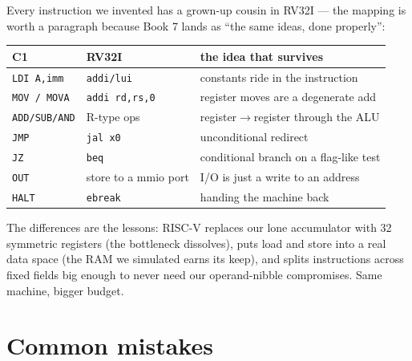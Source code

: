 Every instruction we invented has a grown-up cousin in RV32I --- the
mapping is worth a paragraph because Book 7 lands as ``the same
ideas, done properly'':

\begin{center}
\begin{tabular}{lll}
\toprule
C1 & RV32I & the idea that survives\\
\midrule
\texttt{LDI A,imm} & \texttt{addi/lui} & constants ride in the instruction\\
\texttt{MOV / MOVA} & \texttt{addi rd,rs,0} & register moves are a degenerate add\\
\texttt{ADD/SUB/AND} & R-type ops & register$\to$register through the ALU\\
\texttt{JMP} & \texttt{jal x0} & unconditional redirect\\
\texttt{JZ} & \texttt{beq} & conditional branch on a flag-like test\\
\texttt{OUT} & store to a mmio port & I/O is just a write to an address\\
\texttt{HALT} & \texttt{ebreak} & handing the machine back\\
\bottomrule
\end{tabular}
\end{center}

The differences are the lessons: RISC-V replaces our lone accumulator
with 32 symmetric registers (the bottleneck dissolves), puts load and
store into a real data space (the RAM we simulated earns its keep),
and splits instructions across fixed fields big enough to never need
our operand-nibble compromises. Same machine, bigger budget.

\section{Common mistakes}\label{sec:cm16}


